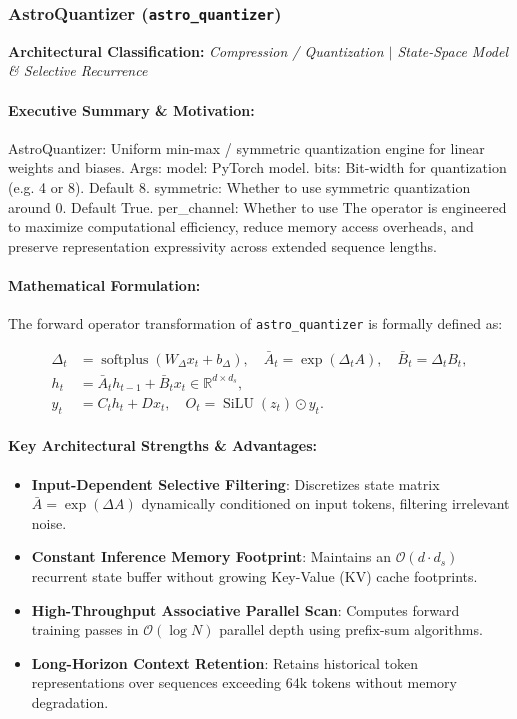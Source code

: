 \subsubsection{AstroQuantizer (\texttt{astro\_quantizer})}
\label{sec:module_astro\_quantizer}

\textbf{Architectural Classification:} \textit{Compression / Quantization $\mid$ State-Space Model & Selective Recurrence}

\paragraph{Executive Summary \& Motivation:}
AstroQuantizer: Uniform min-max / symmetric quantization engine for linear weights and biases.  Args:     model: PyTorch model.     bits: Bit-width for quantization (e.g. 4 or 8). Default 8.     symmetric: Whether to use symmetric quantization around 0. Default True.     per\_channel: Whether to use The operator is engineered to maximize computational efficiency, reduce memory access overheads, and preserve representation expressivity across extended sequence lengths.

\paragraph{Mathematical Formulation:}
The forward operator transformation of \texttt{astro\_quantizer} is formally defined as:

\begin{align}
\Delta_t &= \operatorname{softplus}(W_\Delta x_t + b_\Delta), \quad \bar{A}_t = \exp(\Delta_t A), \quad \bar{B}_t = \Delta_t B_t, \\
h_t &= \bar{A}_t h_{t-1} + \bar{B}_t x_t \in \mathbb{R}^{d \times d_s}, \\
y_t &= C_t h_t + D x_t, \quad O_t = \operatorname{SiLU}(z_t) \odot y_t.
\end{align}


\paragraph{Key Architectural Strengths \& Advantages:}
\begin{itemize}
    \item \textbf{Input-Dependent Selective Filtering}: Discretizes state matrix $\bar{A} = \exp(\Delta A)$ dynamically conditioned on input tokens, filtering irrelevant noise.
    \item \textbf{Constant Inference Memory Footprint}: Maintains an $\mathcal{O}(d \cdot d_s)$ recurrent state buffer without growing Key-Value (KV) cache footprints.
    \item \textbf{High-Throughput Associative Parallel Scan}: Computes forward training passes in $\mathcal{O}(\log N)$ parallel depth using prefix-sum algorithms.
    \item \textbf{Long-Horizon Context Retention}: Retains historical token representations over sequences exceeding $64\text{k}$ tokens without memory degradation.
\end{itemize}

